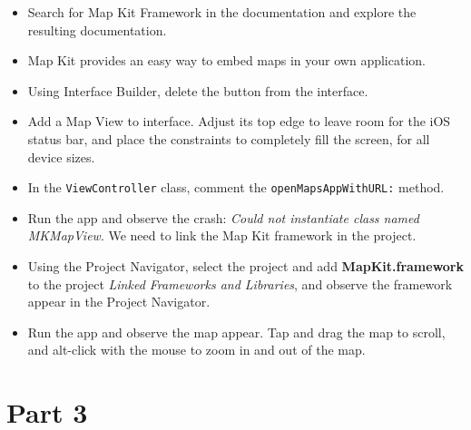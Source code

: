 \documentclass[a4paper,11pt]{scrartcl}
\begin{document}
\begin{itemize}
\item Search for Map Kit Framework in the documentation and explore the resulting documentation.
\item Map Kit provides an easy way to embed maps in your own application.
\item Using Interface Builder, delete the button from the interface.
\item Add a Map View to interface. Adjust its top edge to leave room for the iOS status bar, and place the constraints to completely fill the screen, for all device sizes.
\item In the \texttt{ViewController} class, comment the \texttt{openMapsAppWithURL:} method.
\item Run the app and observe the crash: \textit{Could not instantiate class named MKMapView}. We need to link the Map Kit framework in the project.
\item Using the Project Navigator, select the project and add \textbf{MapKit.framework} to the project \textit{Linked Frameworks and Libraries}, and observe the framework appear in the Project Navigator.
\item Run the app and observe the map appear. Tap and drag the map to scroll, and alt-click with the mouse to zoom in and out of the map.
\end{itemize}

\section*{Part 3}
\end{document}
